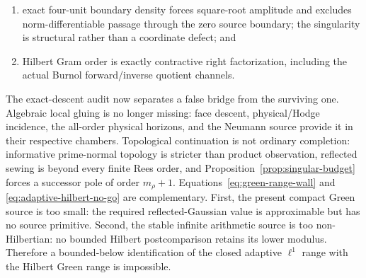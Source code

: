 \documentclass[11pt]{article}
\theoremstyle{definition}
\theoremstyle{remark}
\begin{document}
\begin{enumerate}[leftmargin=2.2em]
      while the division-free pre-scalar completed reporter has exact limiting
      energy eight and a retained Xi graph factorization; totality of its
      damping orbit forbids every same-carrier four-unit reporter preserving
      the full coefficient packet; and
\item exact four-unit boundary density forces square-root amplitude and
      excludes norm-differentiable passage through the zero source boundary;
      the singularity is structural rather than a coordinate defect; and
\item Hilbert Gram order is exactly contractive right factorization, including
      the actual Burnol forward/inverse quotient channels.
\end{enumerate}

The exact-descent audit now separates a false bridge from the surviving one.
Algebraic local gluing is no longer missing: face descent,
physical/Hodge incidence, the all-order physical horizons, and the Neumann
source provide it in their respective chambers.  Topological continuation
is not ordinary completion: informative prime-normal topology is stricter
than product observation, reflected sewing is beyond every finite Rees
order, and Proposition~\ref{prop:singular-budget} forces a successor pole
of order \(m_\rho+1\).  Equations~\eqref{eq:green-range-wall} and
\eqref{eq:adaptive-hilbert-no-go} are complementary.  First, the present
compact Green source is too small: the required reflected-Gaussian value is
approximable but has no source primitive.  Second, the stable infinite
arithmetic source is too non-Hilbertian: no bounded Hilbert postcomparison
retains its lower modulus.  Therefore a bounded-below identification of the
closed adaptive \(\ell^1\) range with the Hilbert Green range is impossible.
\end{document}
